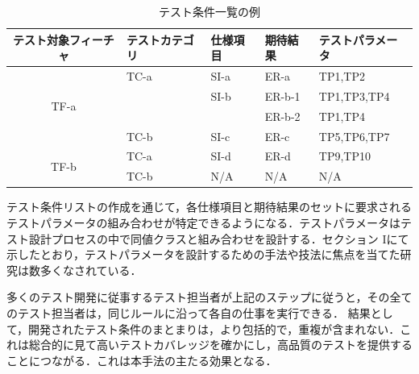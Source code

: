\documentclass[a4paper,11pt]{jreport}
\begin{document}
\begin{table}[htbp]
  \centering
  \caption{テスト条件一覧の例}
    \begin{tabular}{|c|p{6em}|p{6em}|p{6em}|p{7.145em}|}
    \hline
    \multicolumn{1}{|p{8.855em}|}{\textbf{テスト対象フィーチャ}} & \textbf{テストカテゴリ} & \textbf{仕様項目} & \textbf{期待結果} & \textbf{テストパラメータ} \bigstrut \\
    \hline
    \multicolumn{1}{|c|}{\multirow{4}[8]{*}{TF-a}} & TC-a  & SI-a  & ER-a  & TP1,TP2 \bigstrut\\
\cline{2-5}          & \multicolumn{1}{l|}{} & SI-b  & ER-b-1 & TP1,TP3,TP4 \bigstrut\\
\cline{2-5}          & \multicolumn{1}{l|}{} & \multicolumn{1}{l|}{} & ER-b-2 & TP1,TP4 \bigstrut\\
\cline{2-5}          & TC-b  & SI-c  & ER-c  & TP5,TP6,TP7 \bigstrut\\
    \hline
    \multicolumn{1}{|c|}{\multirow{2}[4]{*}{TF-b}} & TC-a  & SI-d  & ER-d  & TP9,TP10 \bigstrut\\
\cline{2-5}          & TC-b  & N/A   & N/A   & N/A \bigstrut\\
    \hline
    \end{tabular}%
  \label{tbl:D-3-tbl3}%
\end{table}%


テスト条件リストの作成を通じて，各仕様項目と期待結果のセットに要求されるテストパラメータの組み合わせが特定できるようになる．テストパラメータはテスト設計プロセスの中で同値クラスと組み合わせを設計する．セクション Iにて示したとおり，テストパラメータを設計するための手法や技法に焦点を当てた研究は数多くなされている．

      多くのテスト開発に従事するテスト担当者が上記のステップに従うと，その全てのテスト担当者は，同じルールに沿って各自の仕事を実行できる． 結果として，開発されたテスト条件のまとまりは，より包括的で，重複が含まれない．これは総合的に見て高いテストカバレッジを確かにし，高品質のテストを提供することにつながる．これは本手法の主たる効果となる．
\end{document}
